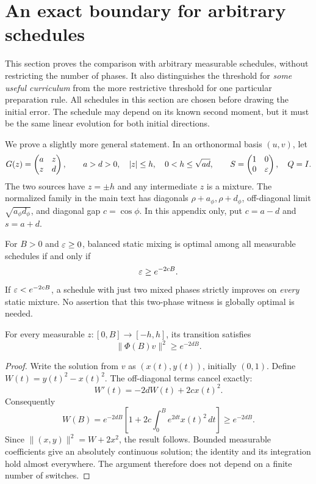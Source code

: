 \section{An exact boundary for arbitrary schedules}\label{app:global}
This section proves the comparison with arbitrary measurable schedules, without restricting the number of phases. It also distinguishes the threshold for \emph{some useful curriculum} from the more restrictive threshold for one particular preparation rule. All schedules in this section are chosen before drawing the initial error. The schedule may depend on its known second moment, but it must be the same linear evolution for both initial directions.

We prove a slightly more general statement. In an orthonormal basis $(u,v)$, let
\[
 G(z)=\begin{pmatrix}a&z\\z&d\end{pmatrix},\qquad
 a>d>0,\quad |z|\le h,\quad 0<h\le\sqrt{ad},\qquad
 S=\begin{pmatrix}1&0\\0&\varepsilon\end{pmatrix},\quad Q=I.
\]
The two sources have $z=\pm h$ and any intermediate $z$ is a mixture. The normalized family in the main text has diagonals $\rho+a_\phi,\rho+d_\phi$, off-diagonal limit $\sqrt{a_\phi d_\phi}$, and diagonal gap $c=\cos\phi$. In this appendix only, put $c=a-d$ and $s=a+d$.

\begin{theorem}\label{thm:general_boundary}
For $B>0$ and $\varepsilon\ge0$, balanced static mixing is optimal among all measurable schedules if and only if
\[
 \varepsilon\ge e^{-2cB}.
\]
If $\varepsilon<e^{-2cB}$, a schedule with just two mixed phases strictly improves on \emph{every} static mixture. No assertion that this two-phase witness is globally optimal is needed.
\end{theorem}

\begin{lemma}\label{lem:slow_column}
For every measurable $z:[0,B]\to[-h,h]$, its transition satisfies
\[
 \|\Phi(B)v\|^2\ge e^{-2dB}.
\]
\end{lemma}
\begin{proof}
Write the solution from $v$ as $(x(t),y(t))$, initially $(0,1)$. Define $W(t)=y(t)^2-x(t)^2$. The off-diagonal terms cancel exactly:
\[
 W'(t)=-2dW(t)+2c x(t)^2.
\]
Consequently
\begin{equation}
 W(B)=e^{-2dB}\left[1+2c\int_0^B e^{2dt}x(t)^2\,dt\right]\ge e^{-2dB}.
 \label{eq:lorentz_identity}
\end{equation}
Since $\|(x,y)\|^2=W+2x^2$, the result follows. Bounded measurable coefficients give an absolutely continuous solution; the identity and its integration hold almost everywhere. The argument therefore does not depend on a finite number of switches.
\end{proof}

